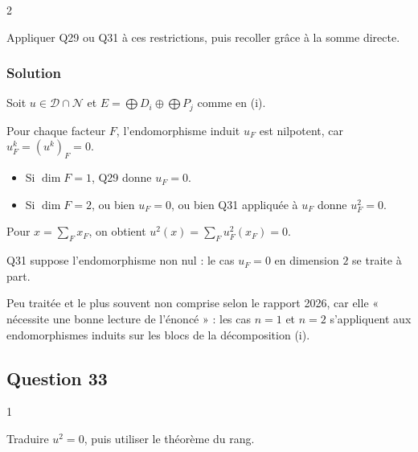 \documentclass[11pt,a4paper]{article}
\providecommand{\tightlist}{\setlength{\itemsep}{0pt}\setlength{\parskip}{0pt}}
\newcommand{\equationajustee}[1]{%
  \sbox{\boiteequation}{$\displaystyle #1$}%
  \ifdim\wd\boiteequation>\linewidth
    \[\resizebox{\linewidth}{!}{\usebox{\boiteequation}}\]%
  \else
    \[#1\]%
  \fi}
\begin{document}
\begin{indication}{2}

Appliquer Q29 ou Q31 à ces restrictions, puis recoller grâce à la somme directe.

\end{indication}

\hypertarget{solution-31}{%
\subsubsection{Solution}\label{solution-31}}

Soit \(u\in\mathcal D\cap\mathcal N\) et \(E=\bigoplus D_i\oplus\bigoplus P_j\) comme en (i).

Pour chaque facteur \(F\), l'endomorphisme induit \(u_F\) est nilpotent, car \(u_F^k=(u^k)_F=0\).

\begin{itemize}
\tightlist
\item
  Si \(\dim F=1\), Q29 donne \(u_F=0\).
\item
  Si \(\dim F=2\), ou bien \(u_F=0\), ou bien Q31 appliquée à \(u_F\) donne \(u_F^2=0\).
\end{itemize}

Pour \(x=\sum_Fx_F\), on obtient \(u^2(x)=\sum_Fu_F^2(x_F)=0\).

\equationajustee{\boxed{\mathcal D\cap\mathcal N\subset\mathcal N_2.}}

\begin{piege}

Q31 suppose l'endomorphisme non nul : le cas \(u_F=0\) en dimension \(2\) se traite à part.

\end{piege}

\begin{jury}

Peu traitée et le plus souvent non comprise selon le rapport 2026, car elle « nécessite une bonne lecture de l'énoncé » : les cas \(n=1\) et \(n=2\) s'appliquent aux endomorphismes induits sur les blocs de la décomposition (i).

\end{jury}

\hypertarget{question-33}{%
\subsection{Question 33}\label{question-33}}

\begin{indication}{1}

Traduire \(u^2=0\), puis utiliser le théorème du rang.

\end{indication}
\end{document}

